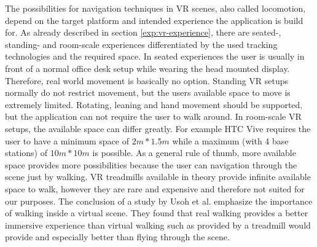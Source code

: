 The possibilities for navigation techniques in VR scenes, also called locomotion, depend on the target platform and intended experience the application is build for. As already described in section \ref{exp:vr-experience}, there are seated-, standing- and room-scale experiences differentiated by the used tracking technologies and the required space.
In seated experiences the user is usually in front of a normal office desk setup while wearing the head mounted display. Therefore, real world movement is basically no option. 
Standing VR setups normally do not restrict movement, but the users available space to move is extremely limited. Rotating, leaning and hand movement should be supported, but the application can not require the user to walk around.
In room-scale VR setups, the available space can differ greatly. For example HTC Vive requires the user to have a minimum space of $2m * 1.5m$ while a maximum (with 4 base stations) of $10m * 10m$ is possible. As a general rule of thumb, more available space provides more possibilities because the user can navigation through the scene just by walking. 
VR treadmills available in theory provide infinite available space to walk, however they are rare and expensive and therefore not suited for our purposes. The conclusion of a study by Usoh et al. \cite{usoh_walking_1999} emphasize the importance of walking inside a virtual scene. They found that real walking provides a better immersive experience than virtual walking such as provided by a treadmill would provide and especially better than flying through the scene. 

